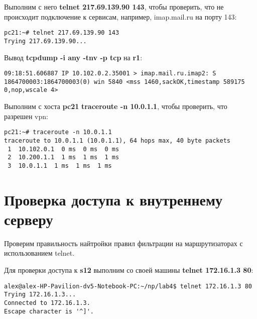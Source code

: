 \documentclass[a4paper,12pt]{article}
\begin{document}
Выполним с него \textbf{telnet 217.69.139.90 143},  чтобы проверить, что не
происходит подключение к сервисам, например, imap.mail.ru на порту 143:
\begin{Verbatim}
pc21:~# telnet 217.69.139.90 143
Trying 217.69.139.90...
\end{Verbatim}

Вывод \textbf{tcpdump -i any -tnv -p tcp} на \textbf{r1}:
\begin{Verbatim}
09:18:51.606887 IP 10.102.0.2.35001 > imap.mail.ru.imap2: S 1864700003:1864700003(0) win 5840 <mss 1460,sackOK,timestamp 589175 0,nop,wscale 4>
\end{Verbatim}

Выполним с хоста \textbf{pc21} \textbf{traceroute -n 10.0.1.1},  чтобы проверить,
что разрешен vpn:
\begin{Verbatim}
pc21:~# traceroute -n 10.0.1.1
traceroute to 10.0.1.1 (10.0.1.1), 64 hops max, 40 byte packets
 1  10.102.0.1  0 ms  0 ms  0 ms
 2  10.200.1.1  1 ms  1 ms  1 ms
 3  10.0.1.1  1 ms  1 ms  1 ms
\end{Verbatim}


\section{Проверка доступа к внутреннему серверу}

Проверим правильность найтройки правил фильтрации на маршрутизаторах
с использованием  telnet.

Для проверки доступа к \textbf{s12} выполним со своей машины
\textbf{telnet 172.16.1.3 80}:
\begin{Verbatim}
alex@alex-HP-Pavilion-dv5-Notebook-PC:~/np/lab4$ telnet 172.16.1.3 80
Trying 172.16.1.3...
Connected to 172.16.1.3.
Escape character is '^]'.
\end{Verbatim}
\end{document}
